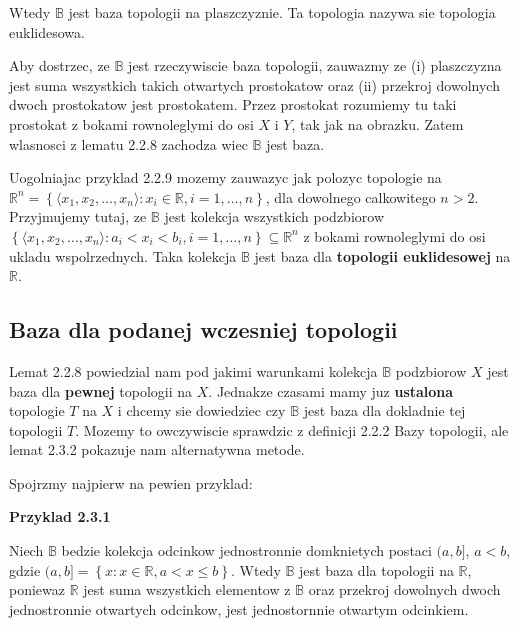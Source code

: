 \documentclass{article}
\begin{document}
Wtedy $\mathbb{B}$ jest baza topologii na plaszczyznie. Ta topologia nazywa sie topologia euklidesowa.

Aby dostrzec, ze $\mathbb{B}$ jest rzeczywiscie baza topologii, zauwazmy ze (i) plaszczyzna jest suma wszystkich takich otwartych prostokatow oraz (ii) przekroj dowolnych dwoch prostokatow jest prostokatem. Przez prostokat rozumiemy tu taki prostokat z bokami rownoleglymi do osi $X$ i $Y$, tak jak na obrazku. Zatem wlasnosci z lematu 2.2.8 zachodza wiec $\mathbb{B}$ jest baza.

\begin{tcolorbox}[colback=white!90!green,colframe=black!35!green,title=2.2.10 Lematokomentarz: Uogolnienie Przykladu 2.2.9]

    Uogolniajac przyklad 2.2.9 mozemy zauwazyc jak polozyc topologie na $\mathbb{R}^{n} = \left\{ \langle x_{1}, x_{2}, \dots, x_{n} \rangle : x_{i} \in \mathbb{R}, i = 1, \dots, n \right\}$, dla dowolnego calkowitego $n > 2$. Przyjmujemy tutaj, ze $\mathbb{B}$ jest kolekcja wszystkich podzbiorow $\left\{ \langle x_{1}, x_{2}, \dots, x_{n} \rangle :a_{i} <  x_{i} < b_{i}, i = 1, \dots, n \right\} \subseteq \mathbb{R}^{n}$ z bokami rownoleglymi do osi ukladu wspolrzednych. Taka kolekcja $\mathbb{B}$ jest baza dla \textbf{topologii euklidesowej} na $\mathbb{R}$.
\end{tcolorbox}

\subsection{Baza dla podanej wczesniej topologii}

Lemat 2.2.8 powiedzial nam pod jakimi warunkami kolekcja $\mathbb{B}$ podzbiorow $X$ jest baza dla \textbf{pewnej} topologii na $X$. Jednakze czasami mamy juz \textbf{ustalona} topologie $T$ na $X$ i chcemy sie dowiedziec czy $\mathbb{B}$ jest baza dla dokladnie tej topologii $T$. Mozemy to owczywiscie sprawdzic z definicji 2.2.2 Bazy topologii, ale lemat 2.3.2 pokazuje nam alternatywna metode.

Spojrzmy najpierw na pewien przyklad:

\textbf{Przyklad 2.3.1}

Niech $\mathbb{B}$ bedzie kolekcja odcinkow jednostronnie domknietych postaci $(a, b]$, $a<b$, gdzie $(a,b] = \left\{ x: x \in \mathbb{R}, a < x \leq b  \right\}$. Wtedy $\mathbb{B}$ jest baza dla topologii na $\mathbb{R}$, poniewaz $\mathbb{R}$ jest suma wszystkich elementow z $\mathbb{B}$ oraz przekroj dowolnych dwoch jednostronnie otwartych odcinkow, jest jednostornnie otwartym odcinkiem. 
\end{document}
